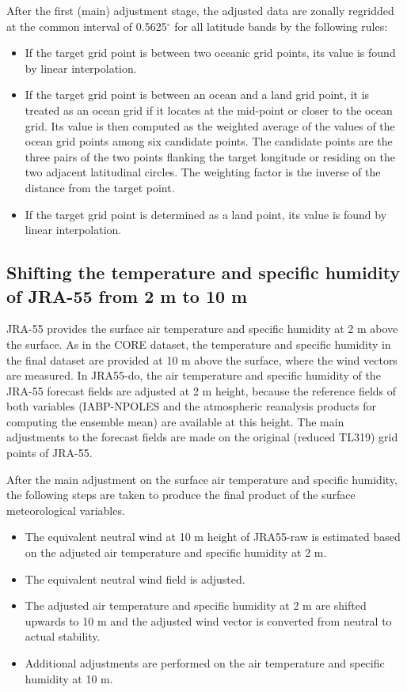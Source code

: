 \documentclass[dvipdfmx]{elsarticle_mod}
\begin{document}
After the first (main) adjustment stage, the adjusted data are zonally regridded at the common interval of 0.5625$^{\circ}$ for all latitude bands by the following rules:
\begin{itemize}
 \item If the target grid point is between two oceanic grid points, its value is found by linear interpolation.
 \item If the target grid point is between an ocean and a land grid point, it is treated as an ocean grid if it locates at the mid-point or closer to the ocean grid. Its value is then computed as the weighted average of the values of the ocean grid points among six candidate points. The candidate points are the three pairs of the two points flanking the target longitude or residing on the two adjacent latitudinal circles. The weighting factor is the inverse of the distance from the target point.
 \item If the target grid point is determined as a land point, its value is found by linear interpolation.
\end{itemize}


\subsection{Shifting the temperature and specific humidity of JRA-55 from 2 m to 10 m}

\label{app:shift}

JRA-55 provides the surface air temperature and specific humidity at 2 m above the surface. As in the CORE dataset, the temperature and specific humidity in the final dataset are provided at 10 m above the surface, where the wind vectors are measured. In JRA55-do, the air temperature and specific humidity of the JRA-55 forecast fields are adjusted at 2 m height, because the reference fields of both variables (IABP-NPOLES and the atmospheric reanalysis products for computing the ensemble mean) are available at this height. The main adjustments to the forecast fields are made on the original (reduced TL319) grid points of JRA-55.

After the main adjustment on the surface air temperature and specific humidity, the following steps are taken to produce the final product of the surface meteorological variables.
\begin{itemize}
 \item The equivalent neutral wind at 10 m height of JRA55-raw is estimated based on the adjusted air temperature and specific humidity at 2 m.
 \item The equivalent neutral wind field is adjusted.
 \item The adjusted air temperature and specific humidity at 2 m are shifted upwards to 10 m and the adjusted wind vector is converted from neutral to actual stability.
 \item Additional adjustments are performed on the air temperature and specific humidity at 10 m.
\end{itemize}
\end{document}
